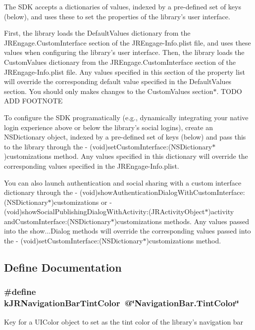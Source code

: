 The SDK accepts a dictionaries of values, indexed by a pre-\/defined set of keys (below), and uses these to set the properties of the library's user interface.

First, the library loads the DefaultValues dictionary from the JREngage.CustomInterface section of the JREngage-\/Info.plist file, and uses these values when configuring the library's user interface. Then, the library loads the CustomValues dictionary from the JREngage.CustomInterface section of the JREngage-\/Info.plist file. Any values specified in this section of the property list will override the corresponding default value specified in the DefaultValues section. You should only makes changes to the CustomValues section$\ast$. TODO ADD FOOTNOTE

To configure the SDK programatically (e.g., dynamically integrating your native login experience above or below the library's social logins), create an NSDictionary object, indexed by a pre-\/defined set of keys (below) and pass this to the library through the -\/ (void)setCustomInterface:(NSDictionary$\ast$)customizations method. Any values specified in this dictionary will override the corresponding values specified in the JREngage-\/Info.plist.

You can also launch authentication and social sharing with a custom interface dictionary through the -\/ (void)showAuthenticationDialogWithCustomInterface:(NSDictionary$\ast$)customizations or -\/ (void)showSocialPublishingDialogWithActivity:(JRActivityObject$\ast$)activity andCustomInterface:(NSDictionary$\ast$)customizations methods. Any values passed into the show...Dialog methods will override the corresponding values passed into the -\/ (void)setCustomInterface:(NSDictionary$\ast$)customizations method. 

\subsection{Define Documentation}
\hypertarget{group__custom_interface_ga7c7ed7dac155537c9bc14531c5cec3cb}{
\subsubsection[{kJRNavigationBarTintColor}]{\setlength{\rightskip}{0pt plus 5cm}\#define kJRNavigationBarTintColor~@\char`\"{}NavigationBar.TintColor\char`\"{}}}
\label{group__custom_interface_ga7c7ed7dac155537c9bc14531c5cec3cb}
Key for a {\ttfamily UIColor} object to set as the tint color of the library's navigation bar


